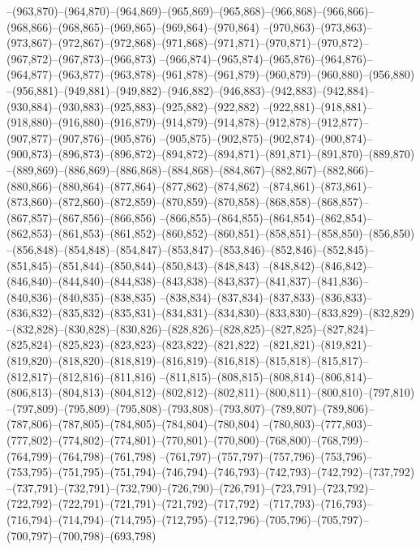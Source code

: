 --(963,870)--(964,870)--(964,869)--(965,869)--(965,868)--(966,868)--(966,866)--(968,866)--(968,865)--(969,865)--(969,864)--(970,864)
--(970,863)--(973,863)--(973,867)--(972,867)--(972,868)--(971,868)--(971,871)--(970,871)--(970,872)--(967,872)--(967,873)--(966,873)
--(966,874)--(965,874)--(965,876)--(964,876)--(964,877)--(963,877)--(963,878)--(961,878)--(961,879)--(960,879)--(960,880)--(956,880)
--(956,881)--(949,881)--(949,882)--(946,882)--(946,883)--(942,883)--(942,884)--(930,884)--(930,883)--(925,883)--(925,882)--(922,882)
--(922,881)--(918,881)--(918,880)--(916,880)--(916,879)--(914,879)--(914,878)--(912,878)--(912,877)--(907,877)--(907,876)--(905,876)
--(905,875)--(902,875)--(902,874)--(900,874)--(900,873)--(896,873)--(896,872)--(894,872)--(894,871)--(891,871)--(891,870)--(889,870)
--(889,869)--(886,869)--(886,868)--(884,868)--(884,867)--(882,867)--(882,866)--(880,866)--(880,864)--(877,864)--(877,862)--(874,862)
--(874,861)--(873,861)--(873,860)--(872,860)--(872,859)--(870,859)--(870,858)--(868,858)--(868,857)--(867,857)--(867,856)--(866,856)
--(866,855)--(864,855)--(864,854)--(862,854)--(862,853)--(861,853)--(861,852)--(860,852)--(860,851)--(858,851)--(858,850)--(856,850)
--(856,848)--(854,848)--(854,847)--(853,847)--(853,846)--(852,846)--(852,845)--(851,845)--(851,844)--(850,844)--(850,843)--(848,843)
--(848,842)--(846,842)--(846,840)--(844,840)--(844,838)--(843,838)--(843,837)--(841,837)--(841,836)--(840,836)--(840,835)--(838,835)
--(838,834)--(837,834)--(837,833)--(836,833)--(836,832)--(835,832)--(835,831)--(834,831)--(834,830)--(833,830)--(833,829)--(832,829)
--(832,828)--(830,828)--(830,826)--(828,826)--(828,825)--(827,825)--(827,824)--(825,824)--(825,823)--(823,823)--(823,822)--(821,822)
--(821,821)--(819,821)--(819,820)--(818,820)--(818,819)--(816,819)--(816,818)--(815,818)--(815,817)--(812,817)--(812,816)--(811,816)
--(811,815)--(808,815)--(808,814)--(806,814)--(806,813)--(804,813)--(804,812)--(802,812)--(802,811)--(800,811)--(800,810)--(797,810)
--(797,809)--(795,809)--(795,808)--(793,808)--(793,807)--(789,807)--(789,806)--(787,806)--(787,805)--(784,805)--(784,804)--(780,804)
--(780,803)--(777,803)--(777,802)--(774,802)--(774,801)--(770,801)--(770,800)--(768,800)--(768,799)--(764,799)--(764,798)--(761,798)
--(761,797)--(757,797)--(757,796)--(753,796)--(753,795)--(751,795)--(751,794)--(746,794)--(746,793)--(742,793)--(742,792)--(737,792)
--(737,791)--(732,791)--(732,790)--(726,790)--(726,791)--(723,791)--(723,792)--(722,792)--(722,791)--(721,791)--(721,792)--(717,792)
--(717,793)--(716,793)--(716,794)--(714,794)--(714,795)--(712,795)--(712,796)--(705,796)--(705,797)--(700,797)--(700,798)--(693,798)
